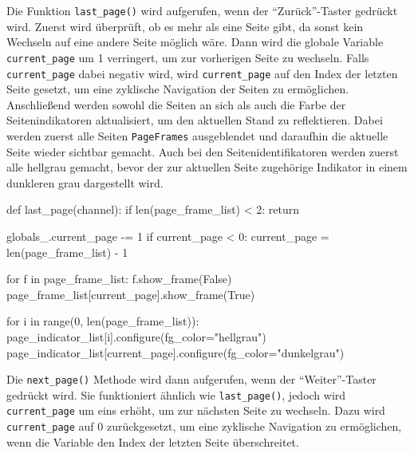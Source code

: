 Die Funktion \lstinline{last_page()} wird aufgerufen, wenn der \enquote{Zurück}-Taster gedrückt wird. Zuerst wird überprüft, ob es mehr als eine Seite gibt, da sonst kein Wechseln auf eine andere Seite möglich wäre. Dann wird die globale Variable \lstinline{current_page} um 1 verringert, um zur vorherigen Seite zu wechseln. Falls \lstinline{current_page} dabei negativ wird, wird \lstinline{current_page} auf den Index der letzten Seite gesetzt, um eine zyklische Navigation der Seiten zu ermöglichen. Anschließend werden sowohl  die Seiten an sich als auch die Farbe der Seitenindikatoren aktualisiert, um den aktuellen Stand zu reflektieren. Dabei werden zuerst alle Seiten \bzw \lstinline{PageFrames} ausgeblendet und daraufhin die aktuelle Seite wieder sichtbar gemacht. Auch bei den Seitenidentifikatoren werden zuerst alle hellgrau gemacht, bevor der zur aktuellen Seite zugehörige Indikator in einem dunkleren grau dargestellt wird.

\begin{pythoncode}
def last_page(channel):
    if len(page_frame_list) < 2:
        return

    globals_.current_page -= 1
    if current_page < 0:
        current_page = len(page_frame_list) - 1

    for f in page_frame_list:
        f.show_frame(False)
    page_frame_list[current_page].show_frame(True)  

    for i in range(0, len(page_frame_list)):
        page_indicator_list[i].configure(fg_color="hellgrau")
    page_indicator_list[current_page].configure(fg_color="dunkelgrau")
\end{pythoncode}

Die \lstinline{next_page()} Methode wird dann aufgerufen, wenn der \enquote{Weiter}-Taster gedrückt wird. Sie funktioniert ähnlich wie \lstinline{last_page()}, jedoch wird \lstinline{current_page} um eins erhöht, um zur nächsten Seite zu wechseln. Dazu wird \lstinline{current_page} auf 0 zurückgesetzt, um eine zyklische Navigation zu ermöglichen, wenn die Variable den Index der letzten Seite überschreitet.